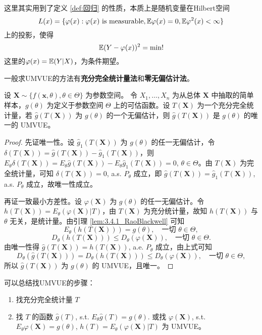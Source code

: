 \begin{remark}
    这里其实用到了定义 \ref{def:回归} 的性质，本质上是随机变量在Hilbert空间
    \begin{equation}\label{eq:Hilbert Space}
        L(x) = \{\varphi(x): \varphi(x)\text{ is measurable}, \mathbb{E}\varphi(x) = 0, \mathbb{E}\varphi^{2}(x)<\infty\}
    \end{equation}
    上的投影，使得
    \begin{equation}
        \mathbb{E}(Y - \varphi(x))^{2} = \text{min!}
    \end{equation}
    这里的$\varphi(x) = \mathbb{E}( Y | X)$，为条件期望。
\end{remark}
\begin{remark}
    一般求UMVUE的方法有\textbf{充分完全统计量法}和\textbf{零无偏估计法}。
\end{remark}

\begin{theorem}\label{thm:Lehmann_Scheff}
    设 $\mathbf{X} \sim \{f(\mathbf{x}, \theta), \theta \in \Theta\}$ 为参数空间。
令 $X_1, \dots, X_n$ 为从总体 $\mathbf{X}$ 中抽取的简单样本，$g(\theta)$ 为定义于参数空间 $\Theta$ 上的可估函数。设 $T(\mathbf{X})$ 为一个充分完全统计量，若 $\hat{g}(T(\mathbf{X}))$ 为 $g(\theta)$ 的一个无偏估计，则 $\hat{g}(T(\mathbf{X}))$ 是 $g(\theta)$ 的唯一的 UMVUE。
\end{theorem}
\begin{proof}
    先证唯一性。设 $\hat{g}_1(T(\mathbf{X}))$ 为 $g(\theta)$ 的任一无偏估计，令 $\delta(T(\mathbf{X})) = \hat{g}(T(\mathbf{X})) - \hat{g}_1(T(\mathbf{X}))$，则 $E_\theta \delta(T(\mathbf{X})) = E_\theta \hat{g}(T(\mathbf{X})) - E_\theta \hat{g}_1(T(\mathbf{X})) = 0$, $\theta \in \Theta$。由 $T(\mathbf{X})$ 为完全统计量，可知 $\delta(T(\mathbf{X})) = 0$, a.s. $P_\theta$ 成立，即 $\hat{g}(T(\mathbf{X})) = \hat{g}_1(T(\mathbf{X}))$, a.s. $P_\theta$ 成立，故唯一性成立。

再证一致最小方差性。设 $\varphi(\mathbf{X})$ 为 $g(\theta)$ 的任一无偏估计。令 $h(T(\mathbf{X})) = E_\theta(\varphi(\mathbf{X})|T)$，由 $T(\mathbf{X})$ 为充分统计量，故知 $h(T(\mathbf{X}))$ 与 $\theta$ 无关，是统计量。由引理 \ref{lem:3.4.1_RaoBlackwell} 可知
$$E_\theta(h(T(\mathbf{X}))) = g(\theta), \quad \text{一切 } \theta \in \Theta,$$
$$D_\theta(h(T(\mathbf{X}))) \leq D_\theta(\varphi(\mathbf{X})), \quad \text{一切 } \theta \in \Theta.$$
由唯一性得 $\hat{g}(T(\mathbf{X})) = h(T(\mathbf{X}))$, a.e. $P_\theta$ 成立，由上式可知
$$D_\theta(\hat{g}(T(\mathbf{X}))) = D_\theta(h(T(\mathbf{X}))) \leq D_\theta(\varphi(\mathbf{X})), \quad \text{一切 } \theta \in \Theta,$$
所以 $\hat{g}(T(\mathbf{X}))$ 为 $g(\theta)$ 的 UMVUE，且唯一。
\end{proof}
\begin{remark}
    可以总结找UMVUE的步骤：
    \begin{enumerate}[(1)]
        \item 找充分完全统计量 $T$
        \item 找 $T$ 的函数 $\hat{g}(T)$, s.t. $E_\theta \hat{g}(T) = g(\theta)$.
        或找 $\varphi(\mathbf{X})$, s.t. $E_\theta \varphi(\mathbf{X}) = g(\theta)$, $h(T) = E_\theta(\varphi(\mathbf{X})|T)$ 为 UMVUE。
    \end{enumerate}
\end{remark}

